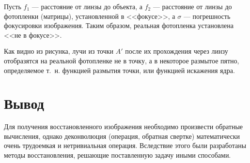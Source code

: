 Пусть $f_1$ --- расстояние от линзы до объекта, а $f_2$ --- расстояние от линзы до фотопленки (матрицы), установленной в <<фокусе>>, а $\sigma$ --- погрешность фокусировки изображения. Таким образом, реальная фотопленка установлена <<не в фокусе>>.

Как видно из рисунка, лучи из точки $A'$ после их прохождения через линзу отобразятся на реальной фотопленке не в точку, а в некоторое размытое пятно, определяемое т.~н. функцией размытия точки, или функцией искажения ядра.~\cite{schema2}


\clearpage

\section*{Вывод}

Для получения восстановленного изображения необходимо произвести обратные вычисления, однако деконволюция (операция, обратная свертке) математически очень трудоемкая и нетривиальная операция. Вследствие этого были разработаны методы восстановления, решающие поставленную задачу иными способами.